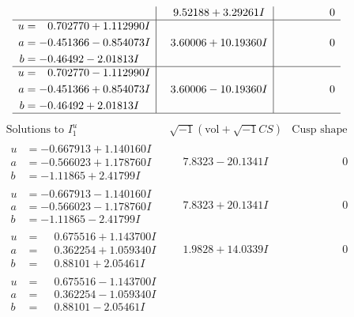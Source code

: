 \documentclass[1p]{elsarticle_modified}
\theoremstyle{definition}
\newcommand{\I}{\sqrt{-1}}
\begin{document}
$$\begin{array}{c|c|c}
 & \phantom{-}9.52188 + 3.29261 I & \phantom{-0.000000 } 0 \\ \hline\begin{aligned}
u &= \phantom{-}0.702770 + 1.112990 I \\
a &= -0.451366 - 0.854073 I \\
b &= -0.46492 - 2.01813 I\end{aligned}
 & \phantom{-}3.60006 + 10.19360 I & \phantom{-0.000000 } 0 \\ \hline\begin{aligned}
u &= \phantom{-}0.702770 - 1.112990 I \\
a &= -0.451366 + 0.854073 I \\
b &= -0.46492 + 2.01813 I\end{aligned}
 & \phantom{-}3.60006 - 10.19360 I & \phantom{-0.000000 } 0\\
 \hline 
 \end{array}$$\newpage$$\begin{array}{c|c|c}  
\text{Solutions to }I^u_{1}& \I (\text{vol} + \sqrt{-1}CS) & \text{Cusp shape}\\
 \hline 
\begin{aligned}
u &= -0.667913 + 1.140160 I \\
a &= -0.566023 + 1.178760 I \\
b &= -1.11865 + 2.41799 I\end{aligned}
 & \phantom{-}7.8323 - 20.1341 I & \phantom{-0.000000 } 0 \\ \hline\begin{aligned}
u &= -0.667913 - 1.140160 I \\
a &= -0.566023 - 1.178760 I \\
b &= -1.11865 - 2.41799 I\end{aligned}
 & \phantom{-}7.8323 + 20.1341 I & \phantom{-0.000000 } 0 \\ \hline\begin{aligned}
u &= \phantom{-}0.675516 + 1.143700 I \\
a &= \phantom{-}0.362254 + 1.059340 I \\
b &= \phantom{-}0.88101 + 2.05461 I\end{aligned}
 & \phantom{-}1.9828 + 14.0339 I & \phantom{-0.000000 } 0 \\ \hline\begin{aligned}
u &= \phantom{-}0.675516 - 1.143700 I \\
a &= \phantom{-}0.362254 - 1.059340 I \\
b &= \phantom{-}0.88101 - 2.05461 I\end{aligned}

\end{array}$$
\end{document}

